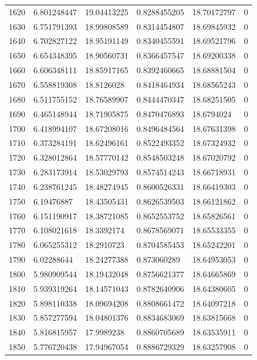\begin{longtable}{llllll}
1620 & 6.801248447 & 19.04413225 & 0.8288455205 & 18.70172797 & 0 \\
1630 & 6.751791393 & 18.99808589 & 0.8314454807 & 18.69845932 & 0 \\
1640 & 6.702827122 & 18.95191149 & 0.8340455591 & 18.69521796 & 0 \\
1650 & 6.654348395 & 18.90560731 & 0.8366457547 & 18.69200338 & 0 \\
1660 & 6.606348111 & 18.85917165 & 0.8392460665 & 18.68881504 & 0 \\
1670 & 6.558819308 & 18.8126028 & 0.8418464934 & 18.68565243 & 0 \\
1680 & 6.511755152 & 18.76589907 & 0.8444470347 & 18.68251505 & 0 \\
1690 & 6.465148944 & 18.71905875 & 0.8470476893 & 18.6794024 & 0 \\
1700 & 6.418994107 & 18.67208016 & 0.8496484564 & 18.67631398 & 0 \\
1710 & 6.373284191 & 18.62496161 & 0.8522493352 & 18.67324932 & 0 \\
1720 & 6.328012864 & 18.57770142 & 0.8548503248 & 18.67020792 & 0 \\
1730 & 6.283173914 & 18.53029793 & 0.8574514243 & 18.66718931 & 0 \\
1740 & 6.238761245 & 18.48274945 & 0.8600526331 & 18.66419303 & 0 \\
1750 & 6.19476887 & 18.43505431 & 0.8626539503 & 18.66121862 & 0 \\
1760 & 6.151190917 & 18.38721085 & 0.8652553752 & 18.65826561 & 0 \\
1770 & 6.108021618 & 18.3392174 & 0.8678569071 & 18.65533355 & 0 \\
1780 & 6.065255312 & 18.2910723 & 0.8704585453 & 18.65242201 & 0 \\
1790 & 6.02288644 & 18.24277388 & 0.873060289 & 18.64953053 & 0 \\
1800 & 5.980909544 & 18.19432048 & 0.8756621377 & 18.64665869 & 0 \\
1810 & 5.939319264 & 18.14571043 & 0.8782640906 & 18.64380605 & 0 \\
1820 & 5.898110338 & 18.09694208 & 0.8808661472 & 18.64097218 & 0 \\
1830 & 5.857277594 & 18.04801376 & 0.8834683069 & 18.63815668 & 0 \\
1840 & 5.816815957 & 17.9989238 & 0.8860705689 & 18.63535911 & 0 \\
1850 & 5.776720438 & 17.94967054 & 0.8886729329 & 18.63257908 & 0 \\

\end{longtable}
